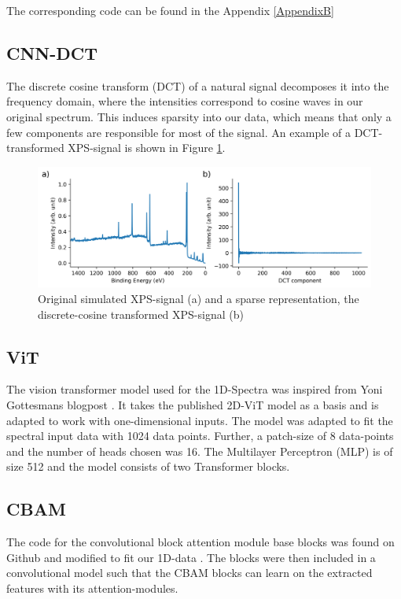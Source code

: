 
The corresponding code can be found in the Appendix \ref{AppendixB}


\subsection{CNN-DCT}
The discrete cosine transform (DCT) of a natural signal decomposes it into the frequency domain, where the intensities correspond to cosine waves in our original spectrum. This induces sparsity into our data, which means that only a few components are responsible for most of the signal. An example of a DCT-transformed XPS-signal is shown in Figure \ref{fig:dct}.

\begin{figure}[H]
    \centering
    \includegraphics[width=\textwidth]{Figures/dct.png}
    \caption{Original simulated XPS-signal (a) and a sparse representation, the discrete-cosine transformed XPS-signal (b)}
    \label{fig:dct}
\end{figure}


\subsection{ViT}
The vision transformer model used for the 1D-Spectra was inspired from Yoni Gottesmans blogpost \cite{noauthor_interpretable_2023}. It takes the published 2D-ViT model  as a basis and is adapted to work with one-dimensional inputs.
The model was adapted to fit the spectral input data with 1024 data points. Further, a patch-size of 8 data-points and the number of heads chosen was 16.
The Multilayer Perceptron (MLP) is of size 512 and the model consists of two Transformer blocks.




\subsection{CBAM}
The code for the convolutional block attention module base blocks was found on Github and modified to fit our 1D-data \cite{mazzia__2023}.
The blocks were then included in a convolutional model such that the CBAM blocks can learn on the extracted features with its attention-modules.

